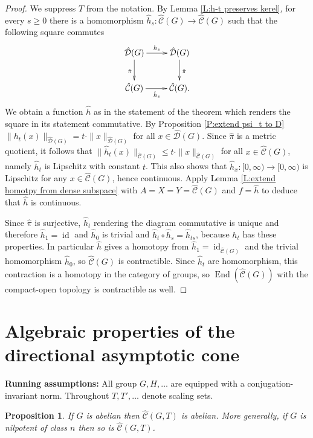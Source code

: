 \documentclass[12pt]{amsart}
\newtheorem{prop}{Proposition}[section]
\theoremstyle{definition}
\newcommand{\OP}[1]{\operatorname{#1}}
\def\D{\mathcal{D}}
\def\tC{\hat{\mathcal{C}}}
\def\tD{\hat{\D}}
\begin{document}
\begin{proof}
We suppress $T$ from the notation.
By Lemma \ref{L:h-t preserves kerel}, for every $s \geq 0$ there is a homomorphism $\hat{h}_s \colon \tC(G) \to \tC(G)$ such that the following square commutes
\[
\xymatrix{
\tD(G) \ar[r]^{h_s} \ar[d]_{\hat{\pi}} &
\tD(G) \ar[d]^{\hat{\pi}} 
\\
\tC(G) \ar[r]_{\hat{h}_s} &
\tC(G).
}
\]
We obtain a function $\hat{h}$ as in the statement of the theorem which renders the square in its statement commutative.
By Proposition \ref{P:extend psi_t to D} $\|h_t(x)\|_{\tD(G)}=t \cdot \|x\|_{\tD(G)}$ for all $x \in \tD(G)$.
Since $\hat{\pi}$ is a metric quotient, it follows that $\|\hat{h}_t(x)\|_{\tC(G)} \leq t \cdot \|x\|_{\tC(G)}$ for all $x \in \tC(G)$, namely $\hat{h}_t$ is Lipschitz with constant $t$.
This also shows that $\hat{h}_x \colon [0,\infty) \to [0,\infty)$ is Lipschitz for any $x \in \tC(G)$, hence continuous.
Apply Lemma \ref{L:extend homotpy from dense subspace} with $A=X=Y=\tC(G)$ and $f=\hat{h}$ to deduce that $\hat{h}$ is continuous.

Since $\hat{\pi}$ is surjective, $\hat{h}_t$ rendering the diagram commutative is unique and therefore $\hat{h}_1=\OP{id}$ and $\hat{h}_0$ is trivial and $\hat{h}_t \circ \hat{h}_s=\hat{h}_{ts}$, because $h_t$ has these properties.
In particular $\hat{h}$ gives a homotopy from $\hat{h}_1=\OP{id}_{\tC(G)}$ and the trivial homomorphism $\hat{h}_0$, so $\tC(G)$ is contractible.
Since $\hat{h}_t$ are homomorphism, this contraction is a homotopy in the category of groups, so $\OP{End}(\tC(G))$ with the compact-open topology is contractible as well.
\end{proof}









\section{Algebraic properties of the directional asymptotic cone}

\noindent
{\bf Running assumptions:}
All group $G,H,\dots$ are equipped with a conjugation-invariant norm.
Throughout $T,T',\dots$ denote scaling sets.




\begin{prop}\label{P:cone of abelian is abelian}
If $G$ is abelian then $\tC(G,T)$ is abelian.
More generally, if $G$ is nilpotent of class $n$ then so is $\tC(G,T)$.
\end{prop}
\end{document}
